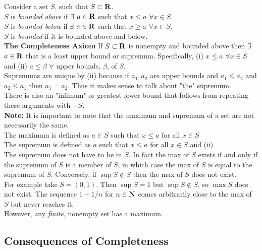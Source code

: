     Consider a set $S$, such that $S \subset \mathbf{R}$.\\
    $S$ is \emph{bounded above} if $\exists$ $a \in \mathbf{R}$ such that $x \leq a$ $\forall x \in S$.\\
    $S$ is \emph{bounded below} if $\exists$ $a \in \mathbf{R}$ such that $x \geq a$ $\forall x \in S$.\\
    $S$ is \emph{bounded} if it is bounded above and below.\\

    \textbf{The Completeness Axiom} If $S \subset \mathbf{R}$ is nonempty and bounded above then 
    $\exists$ $a \in \mathbf{R}$ that is a least upper bound or supremum. Specifically, (i) 
    $x \leq a$ $\forall x \in S$ and (ii) $a \leq \beta$ $\forall$ upper bounds, $\beta$, of $S$.\\

    Supremums are unique by (ii) because if $a_1,a_2$ are upper bounds and $a_1 \leq a_2$ and 
    $a_2 \leq a_1$ then $a_1 = a_2$. Thus it makes sense to talk about "the" supremum.\\

    There is also an "infimum" or greatest lower bound that follows from repeating these 
    arguments with $-S$.\\

    \textbf{Note:} It is important to note that the maximum and supremum of a set are not 
    necessarily the same.\\

    The maximum is defined as $a \in S$ such that $x \leq a$ for all $x \in S$\\
    The supremum is defined as $a$ such that $x \leq a$ for all $x \in S$ and (ii)\\

    The supremum does not have to be in $S$. In fact the max of $S$ exists if and only if the 
    supremum of $S$ is a member of $S$, in which case the max of $S$ is equal to the supremum 
    of $S$. Conversely, if $\sup S \notin S$ then the max of $S$ does not exist.\\

    For example take $S = (0,1)$. Then $\sup S = 1$ but $\sup S \notin S$, so $\max S$ does not
    exist. The sequence $1 - 1/n$ for $n \in \mathbf{N}$ comes arbitrarily close to the max of 
    $S$ but never reaches it.\\

    However, any \emph{finite}, nonempty set has a maximum.
  \subsection{Consequences of Completeness}
